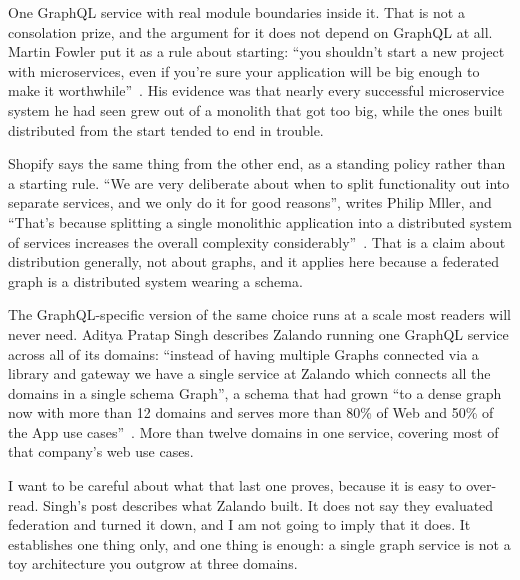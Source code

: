 %
One GraphQL service with real module boundaries inside it. That is not a
consolation prize, and the argument for it does not depend on GraphQL at all.
Martin Fowler put it as a rule about starting: \enquote{you shouldn't start a
new project with microservices, even if you're sure your application will be
big enough to make it worthwhile}~\autocite{fowler2015}. His evidence was that
nearly every successful microservice system he had seen grew out of a monolith
that got too big, while the ones built distributed from the start tended to end
in trouble.

Shopify says the same thing from the other end, as a standing policy rather
than a starting rule. \enquote{We are very deliberate about when to split
functionality out into separate services, and we only do it for good reasons},
writes Philip Mller, and \enquote{That's because splitting a single
monolithic application into a distributed system of services increases the
overall complexity considerably}~\autocite{mueller2020}. That is a claim about
distribution generally, not about graphs, and it applies here because a
federated graph is a distributed system wearing a schema.

The GraphQL-specific version of the same choice runs at a scale most readers
will never need. Aditya Pratap Singh describes Zalando running one GraphQL
service across all of its domains: \enquote{instead of having multiple Graphs connected
via a library and gateway we have a single service at Zalando which connects
all the domains in a single schema Graph}, a schema that had grown \enquote{to
a dense graph now with more than 12 domains and serves more than 80\% of Web
and 50\% of the App use cases}~\autocite{singh2021}. More than twelve domains
in one service, covering most of that company's web use cases.

I want to be careful about what that last one proves, because it is easy to
over-read. Singh's post describes what Zalando built. It does not say they
evaluated federation and turned it down, and I am not going to imply that it
does. It establishes one thing only, and one thing is enough: a single graph
service is not a toy architecture you outgrow at three domains.
